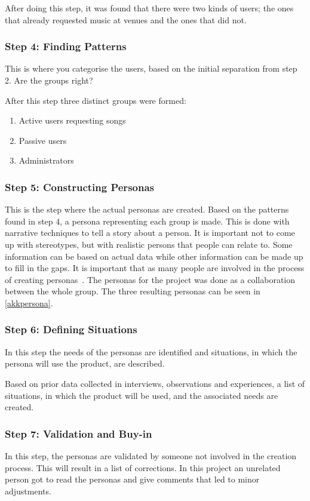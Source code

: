 After doing this step, it was found that there were two kinds of users; the ones that already requested music at venues and the ones that did not.

\subsubsection{Step 4: Finding Patterns}
This is where you categorise the users, based on the initial separation from step 2. Are the groups right?

After this step three distinct groups were formed:
\begin{enumerate}
    \item Active users requesting songs
    \item Passive users
    \item Administrators
\end{enumerate}

\subsubsection{Step 5: Constructing Personas}
This is the step where the actual personas are created. Based on the patterns found in step 4, a persona representing each group is made. This is done with narrative techniques to tell a story about a person. It is important not to come up with stereotypes, but with realistic persons that people can relate to. Some information can be based on actual data while other information can be made up to fill in the gaps. It is important that as many people are involved in the process of creating personas~\cite{nielsen2007persona}. The personas for the project was done as a collaboration between the whole group. The three resulting personas can be seen in \cref{akkpersona}.

\subsubsection{Step 6: Defining Situations}
In this step the needs of the personas are identified and situations, in which the persona will use the product, are described.

Based on prior data collected in interviews, observations and experiences, a list of situations, in which the product will be used, and the associated needs are created.

\subsubsection{Step 7: Validation and Buy-in}
In this step, the personas are validated by someone not involved in the creation process. This will result in a list of corrections. In this project an unrelated person got to read the personas and give comments that led to minor adjustments.

